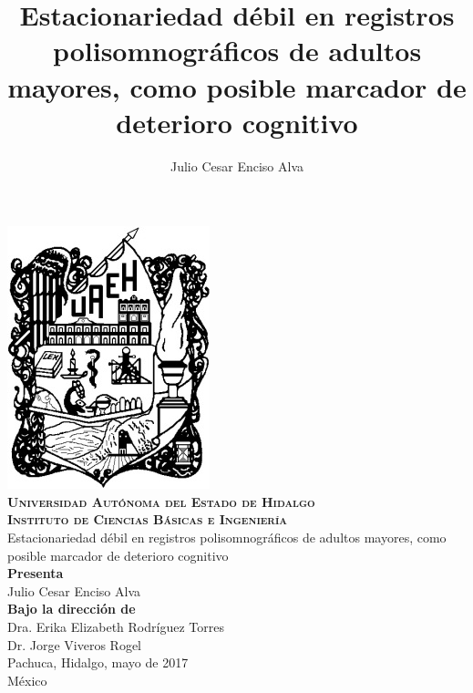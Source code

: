 \documentclass[12pt,a4paper]{mitthesis}
\begin{document}
\setcounter{page}{0}
\thispagestyle{empty}

\title{Estacionariedad d\'ebil en registros polisomnogr\'aficos de adultos mayores,
como posible marcador de deterioro cognitivo}
%
\author{Julio Cesar Enciso Alva}
%
%
%
{

\begin{center}
\includegraphics[width=0.2\linewidth]{./portada/logo_uaeh.png}\\
{\Large \textbf{ \textsc{
Universidad Aut\'onoma del Estado de Hidalgo\\
Instituto de Ciencias B\'asicas e Ingenier\'ia\\
}}
\vspace*{3.5em}
}
{\huge
Estacionariedad d\'ebil en registros polisomnogr\'aficos de adultos mayores,
como posible marcador de deterioro cognitivo\\
\vspace*{2.5em}
}
{\large
\textbf{Presenta}\\
\vspace*{.5em}}
{\Large
Julio Cesar Enciso Alva\\
\vspace*{3em}
}
{\large
\textbf{Bajo la direcci\'on de}\\
\vspace*{.5em}}
{\Large
Dra. Erika Elizabeth Rodr\'iguez Torres\\
Dr. Jorge Viveros Rogel\\
\vspace*{4em}
}
{\large
Pachuca, Hidalgo, mayo de 2017\\
M\'exico
}

\end{center}
}

\newpage

\end{document}
